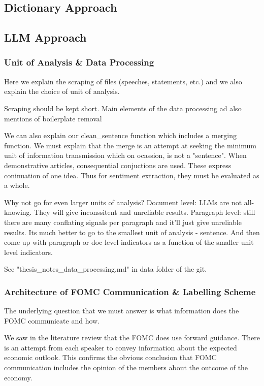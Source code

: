 \documentclass[11pt]{article}
\begin{document}
\subsection{Dictionary Approach}

\subsection{LLM Approach}
\subsubsection{Unit of Analysis \& Data Processing}
Here we explain the scraping of files (speeches, statements, etc.) and we also explain the choice of unit of analysis.

Scraping should be kept short. Main elements of the data processing ad also mentions of boilerplate removal

We can also explain our clean_sentence function which includes a merging function. We must explain that the merge is an attempt at seeking the minimum unit of information transmission which on ocassion, is not a "sentence". When demonstrative articles, consequential conjuctions are used. These express coninuation of one idea. Thus for sentiment extraction, they must be evaluated as a whole.

Why not go for even larger units of analysis? Document level: LLMs are not all-knowing. They will give inconssitent and unreliable results. Paragraph level: still there are many conflating signals per paragraph and it'll just give unreliable results. Its much better to go to the smallest unit of analysis - sentence. And then come up with paragraph or doc level indicators as a function of the smaller unit level indicators. 

See "thesis_notes_data_processing.md" in data folder of the git.

\subsubsection{Architecture of FOMC Communication \& Labelling Scheme}
The underlying question that we must answer is what information does the FOMC communicate and how.

We saw in the literature review that the FOMC does use forward guidance. There is an attempt from each speaker to convey information about the expected economic outlook. This confirms the obvious conclusion that FOMC communication includes the opinion of the members about the outcome of the economy. 
\end{document}
